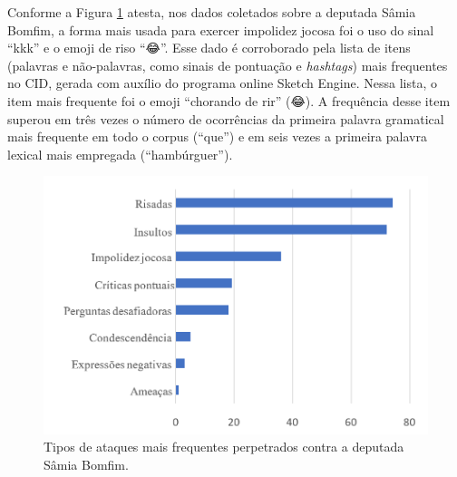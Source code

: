 \documentclass[portuguese]{textolivre}
\begin{document}
Conforme a Figura \ref{graf-2} atesta, nos dados coletados sobre a deputada Sâmia Bomfim, a forma mais usada para exercer impolidez jocosa foi o uso do sinal ``kkk'' e o emoji de riso ``{\Symbola 😂}''.
Esse dado é corroborado pela lista de itens (palavras e não-palavras, como sinais de pontuação e \textit{hashtags}) mais frequentes no CID, gerada com auxílio do programa online Sketch Engine. Nessa lista, o item mais frequente foi o emoji ``chorando de rir'' ({\Symbola 😂}).
A frequência desse item superou em três vezes o número de ocorrências da primeira palavra gramatical mais frequente em todo o corpus (``que'') e em seis vezes a primeira palavra lexical mais empregada (``hambúrguer'').

\begin{figure}[h!]
\centering
\begin{minipage}{.70\textwidth}
\includegraphics[width=\textwidth]{Fig2.png}
\caption{Tipos de ataques mais frequentes perpetrados contra a deputada Sâmia Bomfim.}
\label{graf-2}
\end{minipage}
\end{figure}
\end{document}

